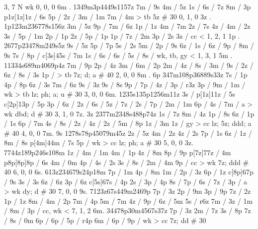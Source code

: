 3, 7
N
wk
0, 0, 0
6m . 
1349m3p4449s1157z 
7m / 9s 
4m / 5z 
1s / 
6s / 7z 
8m / 3p 
p1z[1z]1z / 6s 
5p / 
2z / 
3m / 1m 
7m / 4m 
> tb
5z # 30
%
0, 1, 0
3z .
1p123m236778s156z 
3m / 5z 
9p / 
7m / 6z 
1p / 1z 
4m / 7m 
2z / 7s 
4z / 
4m / 2z 
3s / 
5p / 1m 
2p / 1p 
2z / 
5p / 1p 
1p /
7z / 2m 
3p / 2s 
3z / 
cc < 
% 
1, 2, 1 
1p .
2677p23478m249s5z 
9s / 5z  
5p / 7p 
5s / 2s 
5m / 
2p / 9s 
6z / 
1s / 
6z / 
9p / 
8m / 9s 
7s / 
8p / 
c[3s]45s / 7m 
1s / 
6s / 
6s / 
5s / 
8s / 
wk, tb, gy < 
%
1, 3, 1
5m . 
11334s689m4069p4z 
7m / 9p 
2p / 4z
3m / 
6m / 2p 
2m / 
4z / 
8s / 
3m / 
9s / 
2z / 
6z / 
8s / 3s 
1p / 
> tb 
7z; d; a # 40
%
2, 0, 0
8m . 6p
347m108p36889s33z 
7s / 1p 
4p / 8p 
6z / 3s 
7m / 6z 
9s / 3z 
9s / 8s 
9p / 
7p / 
4z / 
3p / r3z 
3p / 
9m / 
1m / 
wk > tb 
lz; ph; a; u # 30 
% 
3, 0, 0
6m. 
1235s135p1256m11z 
3s / 
p[1z]11z / 5s
c[2p]13p / 5p 
3p / 
6z /
2z / 
6s / 
5z / 
7z / 
2s / 
7p / 
2m / 1m 
6p /
4s / 
7m / a 
> wk 
dbd; d # 30
%
3, 1, 0
7z. 3z
2377m2348s488p74z 
1s / 7z 
8m / 4z 
1p / 8s 
6z / 
1p / 1s 
6p / 7m 
4s / 
8s / 
2z / 
4z / 
2z / 
5m / 8p 
1z / 3m 
1z / 
gy > cc 
lz; 5z; ddd; a # 40
%
4, 0, 0
7m. 9s
1278s78p45079m45z 
2z / 5z 
4m / 2z 
4z / 2s 
7p / 1s 
6z / 
1z / 
8m / 8s 
p[4m]44m / 7s 
5p / 
wk > cc 
lz; ph; a # 30
%
5, 0, 0 
3z.
7744z189p246s108m 
1z / 
4m / 1m 
4m / 1p 
4z / 8m 
8p / 9p 
p[7z]77z / 4m 
p8p[8p]8p / 6s 
4m / 0m 
4p / 
4s / 2s 
3s / 
8s / 
2m / 4m 
9p / 
cc > wk 
7z; ddd # 40
%
6, 0, 0
6s. 
613z234679s24p18m 
7p / 1m 
4p / 8m 
1m / 
2p / 3z 
6p / 1z 
c[8p]67p / 9s 
3s / 3s 
6z / 6z 
3p / 6z 
c[5s]67s / 4p 
2s / 
3p / 4p 
8s / 
7p / 
6s / 
7z / 
3p / a 
> wk 
dy; d # 30
% 
7, 0, 0
9s. 
7123z67s449m2469p
7p / 3z 
2p / 9m 
3p / 9p 
7z / 2z 
1p / 1z 
8m / 
4m / 2p %
7m / 4p
5m / 7m 
4z / 
9p / 
6z / 5m 
5s / r6z 
7m /
3z /
1m /
8m /
3p /
cc, wk <
% 
7, 1, 2
6m. 
34478p30m4567s37z 
7p / 3z 
2m / 7z 
3s / 8p 
7z / 
8s / 0m 
6p /
6p /
5p / r4p 
6m / 
6p / 
9p /
wk > cc 
7z; dd # 30